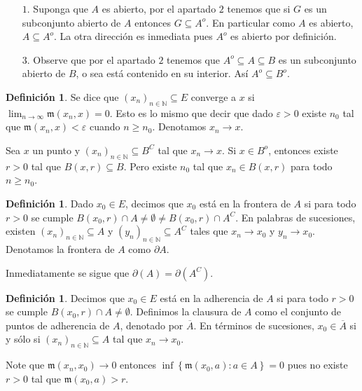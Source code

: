 \documentclass[12pt]{article}
\theoremstyle{plain}
\theoremstyle{definition}
\newtheorem{Def}[Th]{Definición}       %
\theoremstyle{remark}
\numberwithin{equation}{section}
\newcommand{\bN}{\mathbb{N}}        %
\newcommand{\mm}{\mathfrak{m}}      %
\renewcommand{\geq}{\geqslant}      %
\renewcommand{\:}{\colon}           %
\newcommand{\conj}[1]{\left\lbrace#1\right\rbrace}
\begin{document}
\begin{multicols}{2}
\begin{ptcb}
\begin{enumerate}
  \item[$\mathit 1$.] Suponga que $A$ es abierto, por el apartado $\mathit{2}$ tenemos que si $G$ es un subconjunto abierto de $A$ entonces $G\subseteq A^o$. En particular como $A$ es abierto, $A\subseteq A^o$. La otra dirección es inmediata pues $A^o$ es abierto por definición.
  \item[$\mathit 3$.] Observe que por el apartado $\mathit{2}$ tenemos que $A^o\subseteq A\subseteq B$ es un subconjunto abierto de $B$, o sea está contenido en su interior. Así $A^o\subseteq B^o$.
\end{enumerate}
\end{ptcb}

\begin{Def}
  Se dice que $(x_n)_{n\in\bN}\subseteq E$ converge a $x$ si $\lim_{n\to\infty}\mm(x_n,x)=0$. Esto es lo mismo que decir que dado $\varepsilon >0$ existe $n_0$ tal que $\mm(x_n,x)<\varepsilon$ cuando $n\geq n_0$. Denotamos $x_n\to x$.
\end{Def}

Sea $x$ un punto y $(x_n)_{n\in\bN}\subseteq B^C$ tal que $x_n\to x$. Si $x\in B^o$, entonces existe $r>0$ tal que $B(x,r)\subseteq B$. Pero existe $n_0$ tal que $x_n\in B(x,r)$ para todo $n\geq n_0$.

\begin{Def}
  Dado $x_0\in E$, decimos que $x_0$ está en la frontera de $A$ si para todo $r>0$ se cumple $B(x_0,r)\cap A \neq \emptyset \neq B(x_0,r)\cap A^C$. En palabras de sucesiones, existen $(x_n)_{n\in\bN}\subseteq A$ y $(y_n)_{n\in\bN}\subseteq A^C$ tales que $x_n\to x_0$ y $y_n\to x_0$. Denotamos la frontera de $A$ como $\partial A$.
\end{Def}

Inmediatamente se sigue que $\partial(A) = \partial(A^C)$.

\begin{Def}
  Decimos que $x_0\in E$ está en la adherencia de $A$ si para todo $r>0$ se cumple $B(x_0,r)\cap A \neq \emptyset$. Definimos la clausura de $A$ como el conjunto de puntos de adherencia de $A$, denotado por $\overline{A}$. En términos de sucesiones, $x_0\in\overline{A}$ si y sólo si $(x_n)_{n\in\bN}\subseteq A$ tal que $x_n\to x_0$.
\end{Def}

Note que $\mm(x_n,x_0)\to 0$ entonces $\inf\conj{\mm(x_0,a)\colon a\in A}=0$ pues no existe $r>0$ tal que $\mm(x_0,a)> r$.


\end{multicols}
\end{document}
